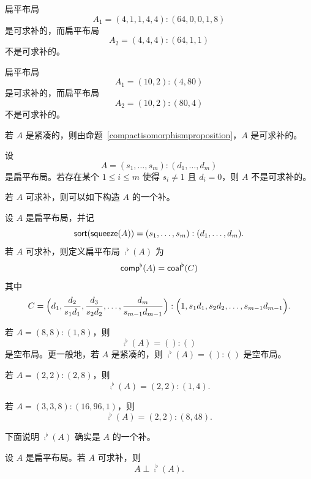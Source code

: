 \begin{example}
    扁平布局
    \[A_1 = (4,1,1,4,4):(64,0,0,1,8)\] 是可求补的，而扁平布局
    \[ A_2 = (4,4,4):(64,1,1)\] 不是可求补的。
\end{example}

\begin{example}
    扁平布局
    \[A_1 = (10,2):(4,80)\] 是可求补的，而扁平布局
    \[ A_2 = (10,2):(80,4)\] 不是可求补的。
\end{example}

\begin{example}
    若 $A$ 是紧凑的，则由命题~\ref{compactisomorphismproposition}，$A$ 是可求补的。
\end{example}

\begin{example}
    设
    \[A = (s_1,\dots,s_m):(d_1,\dots,d_m)\]
    是扁平布局。若存在某个 $1 \leq i \leq m$ 使得 $s_i \neq  1$ 且 $d_i = 0$，则 $A$ 不是可求补的。
\end{example}

若 $A$ 可求补，则可以如下构造 $A$ 的一个补。

\begin{construction}\label{complementconstruction}
    设 $A$ 是扁平布局，并记
    \[\mathsf{sort}(\mathsf{squeeze}(A)) = (s_1,\dots,s_m):(d_1,\dots,d_m).\]
    若 $A$ 可求补，则定义扁平布局 $\comp^\flat(A)$ 为
    \[
    \mathsf{comp}^\flat(A) = \mathsf{coal}^\flat(C)
    \]
    其中
    \[C = \Bigl(d_1 , \dfrac{d_2}{s_1d_1} , \dfrac{d_3}{s_2d_2} , \dots ,\dfrac{d_m}{s_{m-1}d_{m-1}} \Bigr) : \Bigl(1 , s_1d_1 , s_2d_2, \dots ,s_{m-1}d_{m-1}\Bigr).
    \]
\end{construction}

\begin{example}
    若 $A = (8,8):(1,8)$，则
    \[\comp^\flat(A) = ():()\]
    是空布局。更一般地，若 $A$ 是紧凑的，则 $\comp^\flat(A) = ():() $ 是空布局。
\end{example}

\begin{example}
    若 $A = (2,2):(2,8)$，则 \[\comp^\flat(A) = (2,2):(1,4).\]
\end{example}

\begin{example}
    若 $A = (3,3,8):(16,96,1)$，则
    \[\comp^\flat(A) = (2,2):(8,48).\]
\end{example}

\noindent 下面说明 $\comp^\flat(A)$ 确实是 $A$ 的一个补。

\begin{lemma}\label{complementsarecomplements}
    设 $A$ 是扁平布局。若 $A$ 可求补，则
    \[A \perp \comp^\flat(A).\]
\end{lemma}

